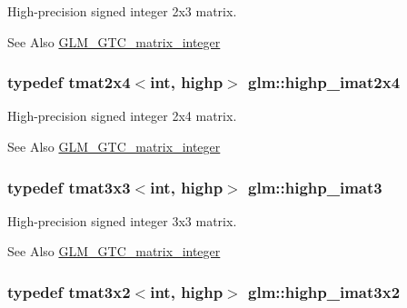 High-\/precision signed integer 2x3 matrix. \begin{DoxySeeAlso}{See Also}
\hyperlink{group__gtc__matrix__integer}{G\-L\-M\-\_\-\-G\-T\-C\-\_\-matrix\-\_\-integer} 
\end{DoxySeeAlso}
\hypertarget{group__gtc__matrix__integer_gae7502957eb2ab9268726d87389ae2b55}{
\subsubsection[{highp\-\_\-imat2x4}]{\setlength{\rightskip}{0pt plus 5cm}typedef tmat2x4$<$int, highp$>$ {\bf glm\-::highp\-\_\-imat2x4}}}\label{group__gtc__matrix__integer_gae7502957eb2ab9268726d87389ae2b55}
High-\/precision signed integer 2x4 matrix. \begin{DoxySeeAlso}{See Also}
\hyperlink{group__gtc__matrix__integer}{G\-L\-M\-\_\-\-G\-T\-C\-\_\-matrix\-\_\-integer} 
\end{DoxySeeAlso}
\hypertarget{group__gtc__matrix__integer_ga0766d11d0154f42893ef0912ab7c6a2c}{
\subsubsection[{highp\-\_\-imat3}]{\setlength{\rightskip}{0pt plus 5cm}typedef tmat3x3$<$int, highp$>$ {\bf glm\-::highp\-\_\-imat3}}}\label{group__gtc__matrix__integer_ga0766d11d0154f42893ef0912ab7c6a2c}
High-\/precision signed integer 3x3 matrix. \begin{DoxySeeAlso}{See Also}
\hyperlink{group__gtc__matrix__integer}{G\-L\-M\-\_\-\-G\-T\-C\-\_\-matrix\-\_\-integer} 
\end{DoxySeeAlso}
\hypertarget{group__gtc__matrix__integer_ga2c8dc817124f44bc01f27777bfce983b}{
\subsubsection[{highp\-\_\-imat3x2}]{\setlength{\rightskip}{0pt plus 5cm}typedef tmat3x2$<$int, highp$>$ {\bf glm\-::highp\-\_\-imat3x2}}}\label{group__gtc__matrix__integer_ga2c8dc817124f44bc01f27777bfce983b}
